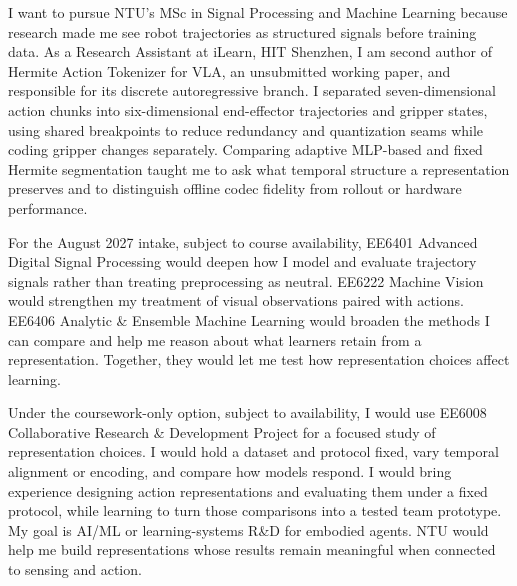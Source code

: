 I want to pursue NTU's MSc in Signal Processing and Machine Learning because research made me see robot trajectories as structured signals before training data. As a Research Assistant at iLearn, HIT Shenzhen, I am second author of Hermite Action Tokenizer for VLA, an unsubmitted working paper, and responsible for its discrete autoregressive branch. I separated seven-dimensional action chunks into six-dimensional end-effector trajectories and gripper states, using shared breakpoints to reduce redundancy and quantization seams while coding gripper changes separately. Comparing adaptive MLP-based and fixed Hermite segmentation taught me to ask what temporal structure a representation preserves and to distinguish offline codec fidelity from rollout or hardware performance.

For the August 2027 intake, subject to course availability, EE6401 Advanced Digital Signal Processing would deepen how I model and evaluate trajectory signals rather than treating preprocessing as neutral. EE6222 Machine Vision would strengthen my treatment of visual observations paired with actions. EE6406 Analytic \& Ensemble Machine Learning would broaden the methods I can compare and help me reason about what learners retain from a representation. Together, they would let me test how representation choices affect learning.

Under the coursework-only option, subject to availability, I would use EE6008 Collaborative Research \& Development Project for a focused study of representation choices. I would hold a dataset and protocol fixed, vary temporal alignment or encoding, and compare how models respond. I would bring experience designing action representations and evaluating them under a fixed protocol, while learning to turn those comparisons into a tested team prototype. My goal is AI/ML or learning-systems R\&D for embodied agents. NTU would help me build representations whose results remain meaningful when connected to sensing and action.
